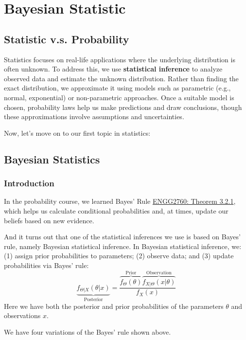 \chapter{Bayesian Statistic}

\section{Statistic v.s. Probability}
Statistics focuses on real-life applications where the underlying distribution is often unknown. To address this, we use \textbf{statistical inference} to analyze observed data and estimate the unknown distribution. Rather than finding the exact distribution, we approximate it using models such as parametric (e.g., normal, exponential) or non-parametric approaches. Once a suitable model is chosen, probability laws help us make predictions and draw conclusions, though these approximations involve assumptions and uncertainties.  

Now, let's move on to our first topic in statistics: 

\section{Bayesian Statistics}

\subsection{Introduction}
In the probability course, we learned Bayes' Rule \href{https://ryanc.wtf/files/ENGG2760.pdf#page=14}{ENGG2760: Theorem 3.2.1}, which helps us calculate conditional probabilities and, at times, update our beliefs based on new evidence.

And it turns out that one of the statistical inferences we use is based on Bayes' rule, namely Bayesian statistical inference. In Bayesian statistical inference, we: (1) assign prior probabilities to parameters; (2) observe data; and (3) update probabilities via Bayes' rule:
\[
  \underbrace{f_{\Theta \vert X} (\theta \vert x)}_{\text{Posterior}} = \dfrac{\overbrace{f_{\Theta} (\theta)}^{\text{Prior}} \overbrace{f_{X \vert \Theta} (x \vert \theta)}^{\text{Observation}}}{f_X (x)}
\]
Here we have both the posterior and prior probabilities of the parameters \(\theta\)  and observations \(x\).  

We have four variations of the Bayes' rule shown above.

